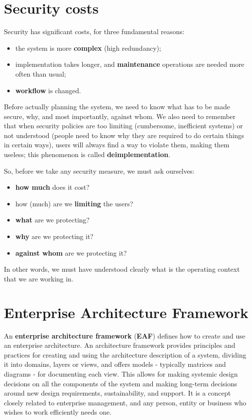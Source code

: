 
\section{Security costs}
Security has significant costs, for three fundamental reasons:

\begin{itemize}
\item the system is more \textbf{complex} (high redundancy);
\item implementation takes longer, and \textbf{maintenance} operations are needed more often than usual;
\item \textbf{workflow} is changed.
\end{itemize}

Before actually planning the system, we need to know what has to be made secure, why, and most importantly, against whom. We also need to remember that when security policies are too limiting (cumbersome, inefficient systems) or not understood (people need to know why they are required to do certain things in certain ways), users will always find a way to violate them, making them useless; this phenomenon is called \textbf{deimplementation}.

So, before we take any security measure, we must ask ourselves:

\begin{itemize}
\item \textbf{how much} does it cost?
\item how (much) are we \textbf{limiting} the users?
\item \textbf{what} are we protecting?
\item \textbf{why} are we protecting it?
\item \textbf{against whom} are we protecting it?
\end{itemize}

In other words, we must have understood clearly what is the operating context that we are working in.


\section{Enterprise Architecture Framework}
An \textbf{enterprise architecture framework} (\textbf{EAF}) defines how to create and use an enterprise architecture. An architecture framework provides principles and practices for creating and using the architecture description of a system, dividing it into domains, layers or views, and offers models - typically matrices and diagrams - for documenting each view. This allows for making systemic design decisions on all the components of the system and making long-term decisions around new design requirements, sustainability, and support. It is a concept closely related to enterprise management, and any person, entity or business who wishes to work efficiently needs one.

